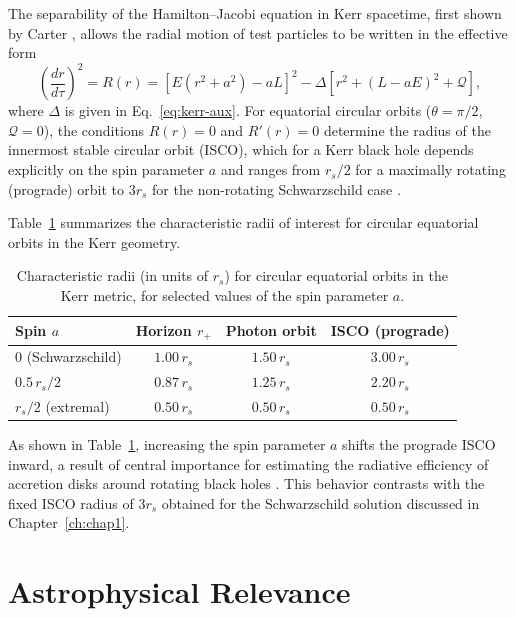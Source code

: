 The separability of the Hamilton--Jacobi equation in Kerr spacetime, first shown by Carter \cite{carter1968}, allows the radial motion of test particles to be written in the effective form
\begin{equation}
	\left(\frac{dr}{d\tau}\right)^2 = R(r) = \left[E\left(r^2+a^2\right) - aL\right]^2 - \Delta\left[r^2 + (L-aE)^2 + \mathcal{Q}\right],
	\label{eq:kerr-radial}
\end{equation}
where $\Delta$ is given in Eq.~\eqref{eq:kerr-aux}. For equatorial circular orbits ($\theta=\pi/2$, $\mathcal{Q}=0$), the conditions $R(r)=0$ and $R'(r)=0$ determine the radius of the innermost stable circular orbit (ISCO), which for a Kerr black hole depends explicitly on the spin parameter $a$ and ranges from $r_s/2$ for a maximally rotating (prograde) orbit to $3r_s$ for the non-rotating Schwarzschild case \cite{bardeen1972}.

Table~\ref{tab:isco} summarizes the characteristic radii of interest for circular equatorial orbits in the Kerr geometry.

\begin{table}[H]
	\centering
	\caption{Characteristic radii (in units of $r_s$) for circular equatorial orbits in the Kerr metric, for selected values of the spin parameter $a$.}
	\label{tab:isco}
	\begin{tabular}{lccc}
		\hline
		\textbf{Spin $a$} & \textbf{Horizon $r_+$} & \textbf{Photon orbit} & \textbf{ISCO (prograde)} \\
		\hline
		$0$ (Schwarzschild) \cite{schwarzschild1916} & $1.00\,r_s$ & $1.50\,r_s$ & $3.00\,r_s$ \\
		$0.5\,r_s/2$ \cite{bardeen1972} & $0.87\,r_s$ & $1.25\,r_s$ & $2.20\,r_s$ \\
		$r_s/2$ (extremal) \cite{kerr1963} & $0.50\,r_s$ & $0.50\,r_s$ & $0.50\,r_s$ \\
		\hline
	\end{tabular}
\end{table}

As shown in Table~\ref{tab:isco}, increasing the spin parameter $a$ shifts the prograde ISCO inward, a result of central importance for estimating the radiative efficiency of accretion disks around rotating black holes \cite{bardeen1972}. This behavior contrasts with the fixed ISCO radius of $3r_s$ obtained for the Schwarzschild solution discussed in Chapter~\ref{ch:chap1}.

\section{Astrophysical Relevance}

